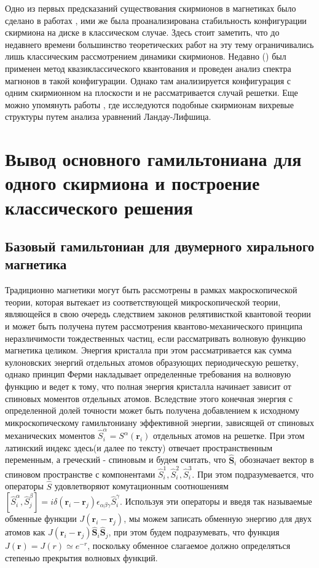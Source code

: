 \documentclass[a4paper,article,14pt]{extarticle}
\begin{document}
Одно из первых предсказаний существования скирмионов в магнетиках было сделано в работах \cite{paper:bogdanov, paper:roslerBogdanov}, ими же была проанализирована стабильность конфигурации скирмиона на диске в классическом случае. Здесь стоит заметить, что до недавнего времени большинство теоретических работ на эту тему ограничивались лишь классическим рассмотрением динамики скирмионов. Недавно (\cite{aristov, garst}) был применен метод квазиклассического квантования и проведен анализ спектра магнонов в такой конфигурации. Однако там анализируется конфигурация с одним скирмионном на плоскости и не рассматривается случай решетки. Еще можно упомянуть работы \cite{paper:zaspel, paper:ivanov, paper:baryakhtar}, где исследуются подобные скирмионам вихревые структуры путем анализа уравнений Ландау-Лифшица.


\section{Вывод основного гамильтониана для одного скирмиона и построение классического решения}
\subsection{Базовый гамильтониан для двумерного хирального магнетика}

Традиционно магнетики могут быть рассмотрены в рамках макроскопической теории, которая вытекает из соответствующей микроскопической теории, являющейся в свою очередь следствием законов релятивисткой квантовой теории и может быть получена путем рассмотрения квантово-механического принципа неразличимости тождественных частиц, если рассматривать волновую функцию магнетика целиком. Энергия кристалла при этом рассматривается как сумма кулоновских энергий отдельных атомов образующих периодическую решетку, однако принцип Ферми накладывает определенные требования на волновую функцию и ведет к тому, что полная энергия кристалла начинает зависит от спиновых моментов отдельных атомов.  Вследствие этого конечная энергия с определенной долей точности может быть получена добавлением к исходному микроскопическому гамильтониану эффективной энергии, зависящей от спиновых механических моментов $\widehat{S}_i^\alpha = S^\alpha (\mathbf{r}_i)$ отдельных атомов на решетке. При этом латинский индекс здесь(и далее по тексту) отвечает пространственным переменным, а греческий - спиновым и будем считать, что $\widehat {\mathbf{S}}_{i}$ обозначает вектор в спиновом пространстве с компонентами $\widehat{S}_i^1,\widehat{S}_i^2,\widehat{S}_i^3$. При этом подразумевается, что операторы $\widehat{S}$ удовлетворяют комутационным соотношениям $[\widehat{S}_i^\alpha, \widehat{S}_j^\beta]=i \delta(\mathbf{r}_i - \mathbf{r}_j) \epsilon_{\alpha \beta \gamma} \widehat{S}_i^\gamma $. Используя эти операторы и введя так называемые обменные функции $J(\mathbf{r}_i - \mathbf{r}_j)$, мы можем записать обменную энергию для двух атомов как $J\left(\mathbf{r}_i - \mathbf{r}_j \right){{\widehat {\mathbf{S}}}_i}{{\widehat {\mathbf{S}}}_j}$, при этом будем подразумевать, что функция $J(\mathbf{r})=J(r)\simeq e^{-r}$, поскольку обменное слагаемое должно определяться степенью прекрытия волновых функций.
\end{document}
